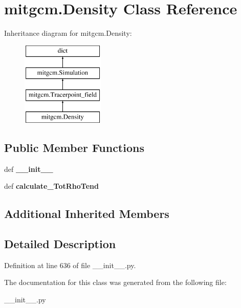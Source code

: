 \hypertarget{classmitgcm_1_1Density}{\section{mitgcm.\+Density Class Reference}
\label{classmitgcm_1_1Density}
}
Inheritance diagram for mitgcm.\+Density\+:\begin{figure}[H]
\begin{center}
\leavevmode
\includegraphics[height=4.000000cm]{classmitgcm_1_1Density}
\end{center}
\end{figure}
\subsection*{Public Member Functions}
\begin{DoxyCompactItemize}
\item 
\hypertarget{classmitgcm_1_1Density_aebdb54f40c181a305136c8d877c188d1}{def {\bfseries \+\_\+\+\_\+init\+\_\+\+\_\+}}\label{classmitgcm_1_1Density_aebdb54f40c181a305136c8d877c188d1}

\item 
\hypertarget{classmitgcm_1_1Density_a8838db86600856226b8856ae1b0ab7e6}{def {\bfseries calculate\+\_\+\+Tot\+Rho\+Tend}}\label{classmitgcm_1_1Density_a8838db86600856226b8856ae1b0ab7e6}

\end{DoxyCompactItemize}
\subsection*{Additional Inherited Members}


\subsection{Detailed Description}


Definition at line 636 of file \+\_\+\+\_\+init\+\_\+\+\_\+.\+py.



The documentation for this class was generated from the following file\+:\begin{DoxyCompactItemize}
\item 
\+\_\+\+\_\+init\+\_\+\+\_\+.\+py\end{DoxyCompactItemize}
